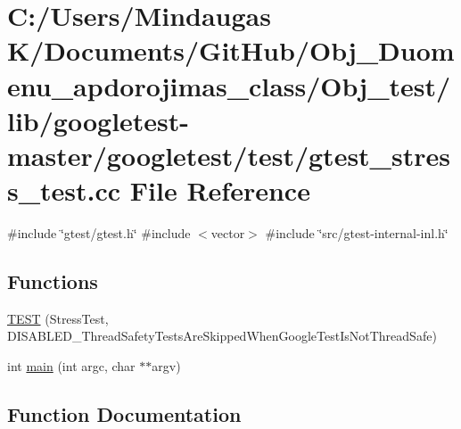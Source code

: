 \hypertarget{_obj__test_2lib_2googletest-master_2googletest_2test_2gtest__stress__test_8cc}{}\section{C\+:/\+Users/\+Mindaugas K/\+Documents/\+Git\+Hub/\+Obj\+\_\+\+Duomenu\+\_\+apdorojimas\+\_\+class/\+Obj\+\_\+test/lib/googletest-\/master/googletest/test/gtest\+\_\+stress\+\_\+test.cc File Reference}
\label{_obj__test_2lib_2googletest-master_2googletest_2test_2gtest__stress__test_8cc}
{\ttfamily \#include \char`\"{}gtest/gtest.\+h\char`\"{}}\newline
{\ttfamily \#include $<$vector$>$}\newline
{\ttfamily \#include \char`\"{}src/gtest-\/internal-\/inl.\+h\char`\"{}}\newline
\subsection*{Functions}
\begin{DoxyCompactItemize}
\item 
\mbox{\hyperlink{_obj__test_2lib_2googletest-master_2googletest_2test_2gtest__stress__test_8cc_ab463b16d4ea21758ce541b0f81e5c5d6}{T\+E\+ST}} (Stress\+Test, D\+I\+S\+A\+B\+L\+E\+D\+\_\+\+Thread\+Safety\+Tests\+Are\+Skipped\+When\+Google\+Test\+Is\+Not\+Thread\+Safe)
\item 
int \mbox{\hyperlink{_obj__test_2lib_2googletest-master_2googletest_2test_2gtest__stress__test_8cc_a3c04138a5bfe5d72780bb7e82a18e627}{main}} (int argc, char $\ast$$\ast$argv)
\end{DoxyCompactItemize}


\subsection{Function Documentation}
\mbox{\label{_obj__test_2lib_2googletest-master_2googletest_2test_2gtest__stress__test_8cc_a3c04138a5bfe5d72780bb7e82a18e627}} 
